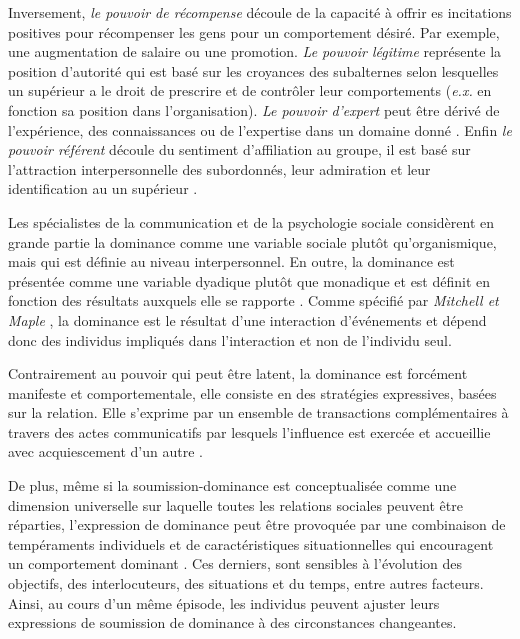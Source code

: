 		Inversement, \textit{le pouvoir de récompense} découle de la capacité à offrir es incitations positives pour récompenser les gens pour un comportement désiré. Par exemple, une augmentation de salaire ou une promotion.
		\textit{Le pouvoir légitime} représente la position d'autorité qui est basé sur les croyances des subalternes selon lesquelles un supérieur a le droit de prescrire et de contrôler leur comportements (\emph{e.x.} en fonction sa position dans l'organisation). 
		\textit{Le pouvoir d'expert} peut être dérivé de l'expérience, des connaissances ou de l'expertise dans un domaine donné \cite{van2006power}. 
		Enfin \textit{le pouvoir référent} découle du sentiment d'affiliation au groupe, il est basé sur l'attraction interpersonnelle des subordonnés, leur admiration et leur identification au un supérieur \cite{van2006power}.
	
		Les spécialistes de la communication et de la psychologie sociale considèrent en grande partie la dominance comme une variable sociale plutôt qu'organismique, mais qui est définie au niveau interpersonnel. En outre, la dominance est présentée comme une variable dyadique plutôt que monadique et est définit en fonction des résultats auxquels elle se rapporte  \cite{burgoon1998nature,burgoon2006nonverbal}.
		Comme spécifié par \emph{Mitchell et Maple} \cite{smither1993authoritarianism}, la dominance est le résultat d'une interaction d'événements et dépend donc des individus impliqués dans l'interaction et non de l'individu seul.
		
	 	Contrairement au pouvoir qui peut être latent, la dominance est forcément manifeste et comportementale, elle consiste en des stratégies expressives, basées sur la relation. Elle s'exprime par un ensemble de transactions complémentaires à travers des actes communicatifs par lesquels l'influence est exercée et accueillie avec acquiescement d'un autre \cite{burgoon2000interactionist,millar1987relational}. 
		
		De plus, même si la soumission-dominance est conceptualisée comme une dimension universelle sur laquelle toutes les relations sociales peuvent être réparties, l'expression de dominance peut être provoquée par une combinaison de tempéraments individuels et de caractéristiques situationnelles	qui encouragent un comportement dominant \cite{burgoon2000interactionist}. Ces derniers, sont sensibles à l'évolution des objectifs, des interlocuteurs, des situations et du temps, entre autres facteurs.
		Ainsi, au cours d'un même épisode, les individus peuvent ajuster leurs expressions de soumission de dominance à des circonstances changeantes.
		
